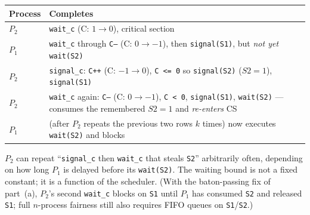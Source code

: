 \documentclass[11pt,a4paper]{article}
\newenvironment{Sol}{%
  \begin{tcolorbox}[sboxstyle, title={Solution}]%
}{%
  \end{tcolorbox}\vspace{0.35em}%
}
\begin{document}
\begin{Sol}
\begin{center}
\small
\begin{tabularx}{\linewidth}{@{}lX@{}}
  \toprule
  Process & Completes \\
  \midrule
  $P_2$ & \texttt{wait\_c} (C: $1\to 0$), critical section \\
  $P_1$ & \texttt{wait\_c} through \texttt{C--} (C: $0\to -1$), then
          \texttt{signal(S1)}, but \emph{not yet} \texttt{wait(S2)} \\
  $P_2$ & \texttt{signal\_c}: \texttt{C++} (C: $-1\to 0$),
          \texttt{C <= 0} so \texttt{signal(S2)} ($S2 = 1$),
          \texttt{signal(S1)} \\
  $P_2$ & \texttt{wait\_c} again: \texttt{C--} (C: $0\to -1$),
          \texttt{C < 0}, \texttt{signal(S1)}, \texttt{wait(S2)}
          --- consumes the remembered $S2=1$ and \emph{re-enters} CS \\
  $P_1$ & (after $P_2$ repeats the previous two rows $k$ times) now executes \texttt{wait(S2)} and blocks \\
  \bottomrule
\end{tabularx}
\end{center}
$P_2$ can repeat ``\texttt{signal\_c} then \texttt{wait\_c} that steals
\texttt{S2}'' arbitrarily often, depending on how long $P_1$ is delayed
before its \texttt{wait(S2)}. The waiting bound is not a fixed constant;
it is a function of the scheduler. (With the baton-passing fix of part~(a),
$P_2$'s second \texttt{wait\_c} blocks on \texttt{S1} until $P_1$ has
consumed \texttt{S2} and released \texttt{S1}; full $n$-process fairness
still also requires FIFO queues on \texttt{S1}/\texttt{S2}.)
\end{Sol}
\end{document}
